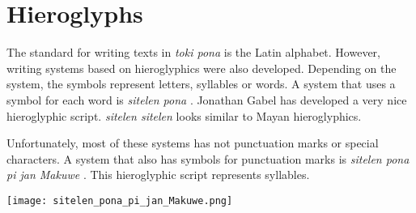 \section{Hieroglyphs}
%

The standard for writing texts in \textit{toki pona} is the Latin alphabet.
However, writing systems based on hieroglyphics were also developed.
Depending on the system, the symbols represent letters, syllables or words.
A system that uses a symbol for each word is \textit{sitelen pona} \cite{www:tokipona.org:02}.
Jonathan Gabel has developed a very nice hieroglyphic script.
\textit{sitelen sitelen} \cite{www:jonathangabel.com:01} looks similar to Mayan hieroglyphics.

Unfortunately, most of these systems has not punctuation marks or special characters.
A system that also has symbols for punctuation marks is \textit{sitelen pona pi jan Makuwe} \cite{www:janMakuwe:01}.
This hieroglyphic script represents syllables.

\texttt{[image: sitelen\_pona\_pi\_jan\_Makuwe.png]}

%

